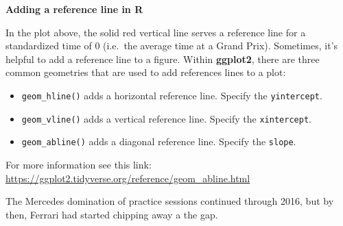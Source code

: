 \documentclass[
]{book}
\providecommand{\tightlist}{%
  \setlength{\itemsep}{0pt}\setlength{\parskip}{0pt}}
\begin{document}
\begin{blackbox}

\begin{center}
\textbf{Adding a reference line in R}

\end{center}

In the plot above, the solid red vertical line serves a reference line for a standardized time of 0 (i.e.~the average time at a Grand Prix). Sometimes, it's helpful to add a reference line to a figure. Within \textbf{ggplot2}, there are three common geometries that are used to add references lines to a plot:

\begin{itemize}
\tightlist
\item
  \texttt{geom\_hline()} adds a horizontal reference line. Specify the \texttt{yintercept}.
\item
  \texttt{geom\_vline()} adds a vertical reference line. Specify the \texttt{xintercept}.
\item
  \texttt{geom\_abline()} adds a diagonal reference line. Specify the \texttt{slope}.
\end{itemize}

For more information see this link: \url{https://ggplot2.tidyverse.org/reference/geom_abline.html}

\end{blackbox}

The Mercedes domination of practice sessions continued through 2016, but by then, Ferrari had started chipping away a the gap.
\end{document}
